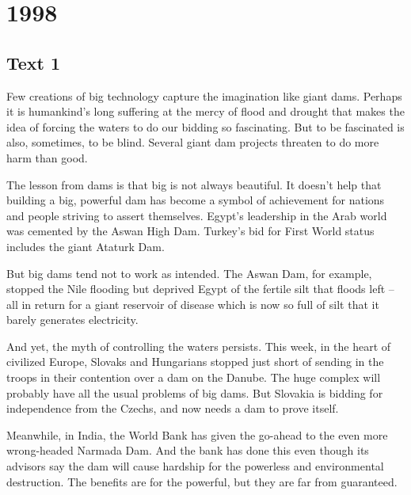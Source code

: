 
\section{1998}
\subsection{Text 1}
Few creations of big technology capture the imagination like giant dams. Perhaps it is humankind’s long suffering at the mercy of flood and drought that makes the idea of forcing the waters to do our bidding so fascinating. But to be fascinated is also, sometimes, to be blind. Several giant dam projects threaten to do more harm than good.

The lesson from dams is that big is not always beautiful. It doesn’t help that building a big, powerful dam has become a symbol of achievement for nations and people striving to assert themselves. Egypt’s leadership in the Arab world was cemented by the Aswan High Dam. Turkey’s bid for First World status includes the giant Ataturk Dam.

But big dams tend not to work as intended. The Aswan Dam, for example, stopped the Nile flooding but deprived Egypt of the fertile silt that floods left -- all in return for a giant reservoir of disease which is now so full of silt that it barely generates electricity.

And yet, the myth of controlling the waters persists. This week, in the heart of civilized Europe, Slovaks and Hungarians stopped just short of sending in the troops in their contention over a dam on the Danube. The huge complex will probably have all the usual problems of big dams. But Slovakia is bidding for independence from the Czechs, and now needs a dam to prove itself.

Meanwhile, in India, the World Bank has given the go-ahead to the even more wrong-headed Narmada Dam. And the bank has done this even though its advisors say the dam will cause hardship for the powerless and environmental destruction. The benefits are for the powerful, but they are far from guaranteed.


